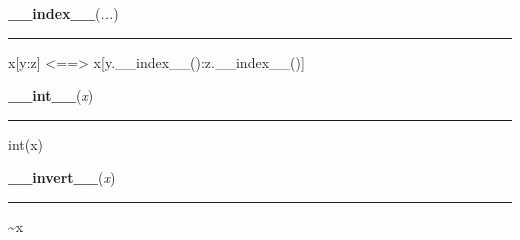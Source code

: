     \label{pygame:Color:__index__}

    \vspace{0.5ex}

\hspace{.8\funcindent}\begin{boxedminipage}{\funcwidth}

    \raggedright \textbf{\_\_index\_\_}(\textit{...})

    \vspace{-1.5ex}

    \rule{\textwidth}{0.5\fboxrule}
\setlength{\parskip}{2ex}
    x[y:z] {\textless}=={\textgreater} 
    x[y.\_\_index\_\_():z.\_\_index\_\_()]

\setlength{\parskip}{1ex}
    \end{boxedminipage}

    \label{pygame:Color:__int__}

    \vspace{0.5ex}

\hspace{.8\funcindent}\begin{boxedminipage}{\funcwidth}

    \raggedright \textbf{\_\_int\_\_}(\textit{x})

    \vspace{-1.5ex}

    \rule{\textwidth}{0.5\fboxrule}
\setlength{\parskip}{2ex}
    int(x)

\setlength{\parskip}{1ex}
    \end{boxedminipage}

    \label{pygame:Color:__invert__}

    \vspace{0.5ex}

\hspace{.8\funcindent}\begin{boxedminipage}{\funcwidth}

    \raggedright \textbf{\_\_invert\_\_}(\textit{x})

    \vspace{-1.5ex}

    \rule{\textwidth}{0.5\fboxrule}
\setlength{\parskip}{2ex}
    {\textasciitilde}x

\setlength{\parskip}{1ex}
    \end{boxedminipage}

